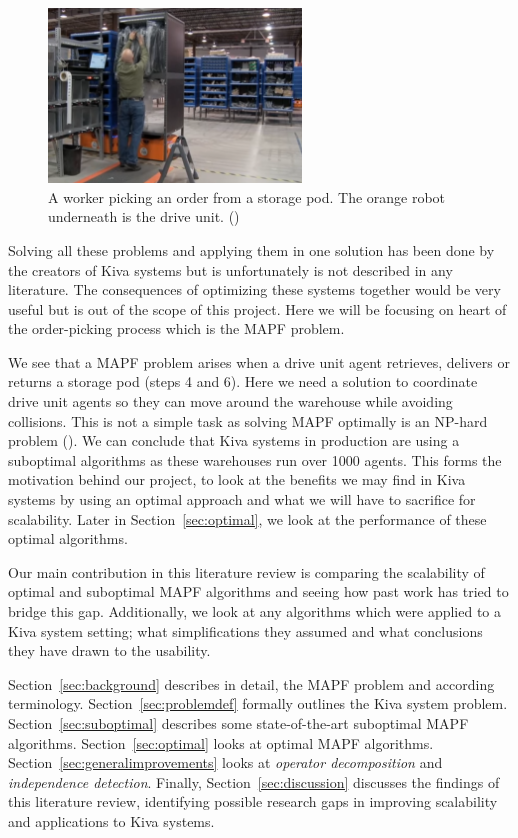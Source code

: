 \documentclass[a4paper,11pt]{article}
\begin{document}
\begin{figure}[h!]
	\centering
	\includegraphics[width=0.6\textwidth ]{graphics/kivaprocess}
	\caption{A worker picking an order from a storage pod. The orange robot underneath is the drive unit. (\cite{kivayoutube2010quietlogistics})}
	\label{fig:kivaprocess}
\end{figure}

Solving all these problems and applying them in one solution has been done by the creators of Kiva systems but is unfortunately is not described in any literature. The consequences of optimizing these systems together would be very useful but is out of the scope of this project. Here we will be focusing on heart of the order-picking process which is the MAPF problem.


We see that a MAPF problem arises when a drive unit agent retrieves, delivers or returns a storage pod (steps 4 and 6). Here we need a solution to coordinate drive unit agents so they can move around the warehouse while avoiding collisions. This is not a simple task as solving MAPF optimally is an NP-hard problem (\cite{yu2013structure}). We can conclude that Kiva systems in production are using a suboptimal algorithms as these warehouses run over 1000 agents. This forms the motivation behind our project, to look at the benefits we may find in Kiva systems by using an optimal approach and what we will have to sacrifice for scalability. Later in Section~\ref{sec:optimal}, we look at the performance of these optimal algorithms.

Our main contribution in this literature review is comparing the scalability of optimal and suboptimal MAPF algorithms and seeing how past work has tried to bridge this gap. Additionally, we look at any algorithms which were applied to a Kiva system setting; what simplifications they assumed and what conclusions they have drawn to the usability. 

Section~\ref{sec:background} describes in detail, the MAPF problem and according terminology. Section~\ref{sec:problemdef} formally outlines the Kiva system problem. Section~\ref{sec:suboptimal} describes some state-of-the-art suboptimal MAPF algorithms. Section~\ref{sec:optimal} looks at optimal MAPF algorithms. Section~\ref{sec:generalimprovements} looks at \textit{operator decomposition} and \textit{independence detection}. Finally, Section~\ref{sec:discussion} discusses the findings of this literature review, identifying possible research gaps in improving scalability and applications to Kiva systems.
\end{document}
